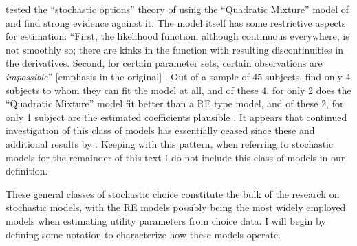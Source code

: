 \documentclass[../main.tex]{subfiles}
\begin{document}
\addtocounter{footnote}{-1}

\textcite{Hey1995} tested the \enquote{stochastic options} theory of \textcite{Machina1985} using the \enquote{Quadratic Mixture} model of \textcite{Chew1991} and find strong evidence against it.
The model itself has some restrictive aspects for estimation: \enquote{First, the likelihood function, although continuous everywhere, is not smoothly so; there are kinks in the function with resulting discontinuities in the derivatives.
Second, for certain parameter sets, certain observations are \textit{impossible}} [emphasis in the original] \parencite*[164]{Hey1995}.
Out of a sample of 45 subjects, \textcite{Hey1995} find only 4 subjects to whom they can fit the model at all, and of these 4, for only 2 does the \enquote{Quadratic Mixture} model fit better than a RE type model, and of these 2, for only 1 subject are the estimated coefficients plausible \parencite*[167]{Hey1995}.
It appears that continued investigation of this class of models has essentially ceased since these and additional results by \textcite{Camerer1994}.
Keeping with this pattern, when referring to stochastic models for the remainder of this text I do not include this class of models in our definition.

These general classes of stochastic choice constitute the bulk of the research on stochastic models, with the RE models possibly being the most widely employed models when estimating utility parameters from choice data.
I will begin by defining some notation to characterize how these models operate.
\end{document}
